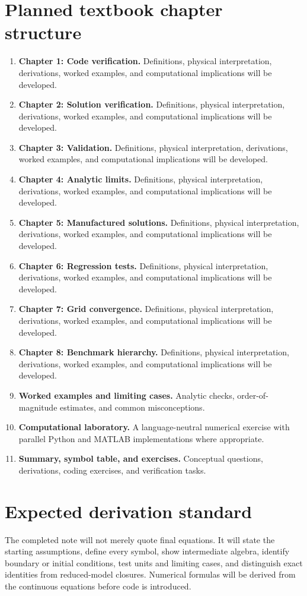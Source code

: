 \documentclass[11pt]{article}
\begin{document}
\section{Planned textbook chapter structure}
\begin{enumerate}[leftmargin=1.8em]
\item \textbf{Chapter 1: Code verification.} Definitions, physical interpretation, derivations, worked examples, and computational implications will be developed.
\item \textbf{Chapter 2: Solution verification.} Definitions, physical interpretation, derivations, worked examples, and computational implications will be developed.
\item \textbf{Chapter 3: Validation.} Definitions, physical interpretation, derivations, worked examples, and computational implications will be developed.
\item \textbf{Chapter 4: Analytic limits.} Definitions, physical interpretation, derivations, worked examples, and computational implications will be developed.
\item \textbf{Chapter 5: Manufactured solutions.} Definitions, physical interpretation, derivations, worked examples, and computational implications will be developed.
\item \textbf{Chapter 6: Regression tests.} Definitions, physical interpretation, derivations, worked examples, and computational implications will be developed.
\item \textbf{Chapter 7: Grid convergence.} Definitions, physical interpretation, derivations, worked examples, and computational implications will be developed.
\item \textbf{Chapter 8: Benchmark hierarchy.} Definitions, physical interpretation, derivations, worked examples, and computational implications will be developed.
\item \textbf{Worked examples and limiting cases.} Analytic checks, order-of-magnitude estimates, and common misconceptions.
\item \textbf{Computational laboratory.} A language-neutral numerical exercise with parallel Python and MATLAB implementations where appropriate.
\item \textbf{Summary, symbol table, and exercises.} Conceptual questions, derivations, coding exercises, and verification tasks.
\end{enumerate}

\section{Expected derivation standard}
The completed note will not merely quote final equations. It will state the starting assumptions, define every symbol, show intermediate algebra, identify boundary or initial conditions, test units and limiting cases, and distinguish exact identities from reduced-model closures. Numerical formulas will be derived from the continuous equations before code is introduced.
\end{document}
